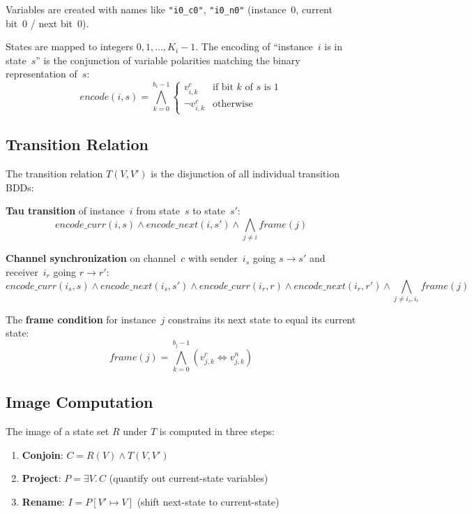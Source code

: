 \documentclass[11pt]{article}
\begin{document}
Variables are created with names like \texttt{"i0\_c0"},
\texttt{"i0\_n0"} (instance~0, current bit~0 / next bit~0).

States are mapped to integers $0, 1, \ldots, K_i - 1$.  The encoding
of ``instance~$i$ is in state~$s$'' is the conjunction of variable
polarities matching the binary representation of~$s$:
\[
  \mathit{encode}(i, s) = \bigwedge_{k=0}^{b_i-1}
    \begin{cases}
      v^c_{i,k} & \text{if bit $k$ of $s$ is 1} \\
      \neg v^c_{i,k} & \text{otherwise}
    \end{cases}
\]

\subsection{Transition Relation}

The transition relation $T(V, V')$ is the disjunction of all individual
transition BDDs:

\textbf{Tau transition} of instance~$i$ from state~$s$ to state~$s'$:
\[
  \mathit{encode\_curr}(i, s) \wedge \mathit{encode\_next}(i, s')
  \wedge \bigwedge_{j \neq i} \mathit{frame}(j)
\]

\textbf{Channel synchronization} on channel~$c$ with sender~$i_s$
going $s \to s'$ and receiver~$i_r$ going $r \to r'$:
\[
  \mathit{encode\_curr}(i_s, s) \wedge \mathit{encode\_next}(i_s, s')
  \wedge \mathit{encode\_curr}(i_r, r) \wedge \mathit{encode\_next}(i_r, r')
  \wedge \bigwedge_{j \neq i_s, i_r} \mathit{frame}(j)
\]

The \textbf{frame condition} for instance~$j$ constrains its next
state to equal its current state:
\[
  \mathit{frame}(j) = \bigwedge_{k=0}^{b_j-1} (v^c_{j,k} \Leftrightarrow v^n_{j,k})
\]

\subsection{Image Computation}

The image of a state set $R$ under $T$ is computed in three steps:

\begin{enumerate}
\item \textbf{Conjoin}: $C = R(V) \wedge T(V, V')$
\item \textbf{Project}: $P = \exists V.\, C$ \quad (quantify out current-state variables)
\item \textbf{Rename}: $I = P[V' \mapsto V]$ \quad (shift next-state to current-state)
\end{enumerate}
\end{document}
